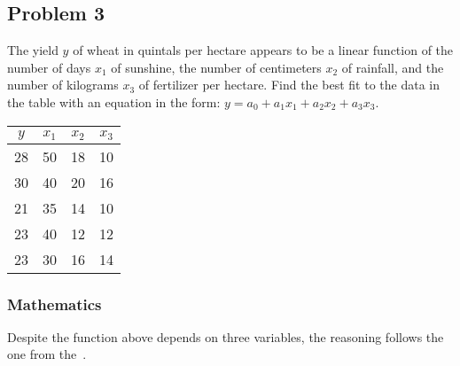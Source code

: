 \subsection{Problem 3}%
\label{sec:problem_3}
The yield $y$ of wheat in quintals per hectare appears to be a linear function of the
number of days $x_1$ of sunshine, the number of centimeters $x_2$ of rainfall, and the
number of kilograms $x_3$ of fertilizer per hectare. Find the best fit to the data in
the table with an equation in the form: $y=a_0+a_1x_1+a_2x_2+a_3x_3$.

\begin{center}
\begin{tabular}{|c|c|c|c|}
  \hline
  $y$ & $x_1$ & $x_2$ & $x_3$ \\
  \hline
  28 & 50 & 18 & 10 \\
  \hline
  30 & 40 & 20 & 16 \\
  \hline
  21 & 35 & 14 & 10 \\
  \hline
  23 & 40 & 12 & 12 \\
  \hline
  23 & 30 & 16 & 14 \\
  \hline
\end{tabular}
\end{center}
\subsubsection*{Mathematics}
Despite the function above depends on three variables, the reasoning follows the one
from the~.
